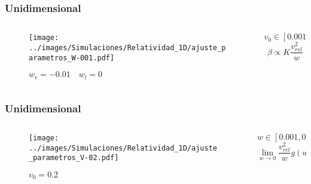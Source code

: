 \documentclass{beamer}
\begin{document}
\begin{frame}[t]
    \frametitle[prueb1]{Unidimensional}
    \begin{columns}
    \begin{column}{0.5\textwidth}
        \begin{figure}
            \centering
            \texttt{[image: ../images/Simulaciones/Relatividad\_1D/ajuste\_parametros\_W-001.pdf]}
            \caption{$w_r = -0.01 \quad w_l = 0$}
        \end{figure}         
    \end{column}
    \begin{column}{0.5\textwidth}
             \begin{equation*}
                v_0 \in [0.001, 0.9]
             \end{equation*}
             \vspace{1cm}
             \begin{equation*}
                \beta \propto K \dfrac{v^2_{rel}}{w}
            \end{equation*}
    \end{column}
    \end{columns}
\end{frame}

\begin{frame}[t]
    \frametitle[prueb1]{Unidimensional}
    \begin{columns}
        \begin{column}{0.5\textwidth}
            \begin{figure}
                \centering
                \texttt{[image: ../images/Simulaciones/Relatividad\_1D/ajuste\_parametros\_V-02.pdf]}
                \caption{$v_0 = 0.2$}  
            \end{figure}         
        \end{column}
    \begin{column}{0.5\textwidth}
        \begin{equation*}
            w \in [0.001, 0.9]
         \end{equation*}
         \vspace{1cm}
         \begin{equation*}
            \lim_{w\rightarrow 0} \dfrac{v^2_{rel}}{w}g(w) = 0
        \end{equation*}
    \end{column}
    \end{columns}
\end{frame}
\end{document}

